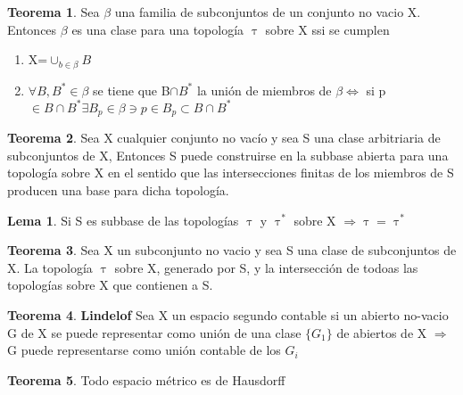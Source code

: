 \documentclass{article}
\theoremstyle{definition}
\newtheorem{theorem}{Teorema}[section]
\newtheorem{lemma}{Lema}[section]
\begin{document}

\begin{theorem}
	 Sea $\beta$ una familia de subconjuntos de un conjunto no vacio X. Entonces $\beta$ es una clase para una topología $\uptau$ sobre X ssi se cumplen 
	 \begin{enumerate}
	 \item X=$\cup_{b\in\beta} B$
	 \item $\forall B, B^*\in\beta$ se tiene que B$\cap B^*$ la unión de miembros de $\beta \Leftrightarrow$ si p$\in B\cap B^*\exists B_p\in\beta\ni p\in B_p\subset B\cap B^*$ 
	 \end{enumerate}
\end{theorem}


\begin{theorem}
	Sea X cualquier conjunto no vacío y sea S una clase arbitriaria de subconjuntos de X, Entonces S puede construirse en la subbase abierta para una topología sobre X en el sentido que las intersecciones finitas de los miembros de S producen una base para dicha topología.
\end{theorem}


\begin{lemma}
Si S es subbase de las topologías $\uptau$ y $\uptau^*$  sobre X $\Rightarrow\uptau = \uptau^*$
\end{lemma}


\begin{theorem}
Sea X un subconjunto no vacio y sea S una clase de subconjuntos de X. La topología $\uptau$ sobre X, generado por S, y la intersección de todoas las topologías sobre X que contienen a S. 
\end{theorem}


\begin{theorem}{\textbf{Lindelof}}
	Sea X un espacio segundo contable si un abierto no-vacio G de X se puede representar como unión de una clase $\{G_1\}$ de abiertos de X $\Rightarrow$ G puede representarse como unión contable de los $G_i$
\end{theorem}


\begin{theorem}
	Todo espacio métrico es de Hausdorff 
\end{theorem}

\end{document}
